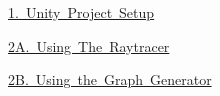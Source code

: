 
\begin{DoxyItemize}
\item \mbox{\hyperlink{_unity_project_setup}{1. Unity Project Setup}}
\item \mbox{\hyperlink{_using_the_raytracer}{2A. Using The Raytracer}}
\item \mbox{\hyperlink{_generating_a_graph}{2B. Using the Graph Generator}} 
\end{DoxyItemize}